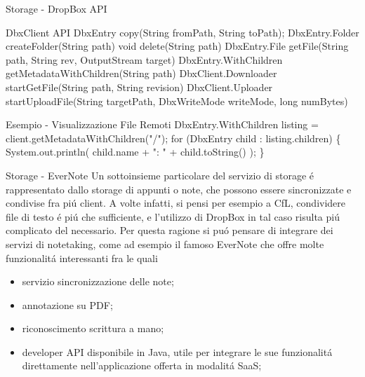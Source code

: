 \documentclass{beamer}
\begin{document}
\begin{frame}{Storage - DropBox API}
\begin{block}{DbxClient API}
{\small
DbxEntry	copy(String fromPath, String toPath);
\newline
DbxEntry.Folder	createFolder(String path)
\newline
void	delete(String path)
\newline
DbxEntry.File	getFile(String path, String rev, OutputStream target)
\newline
DbxEntry.WithChildren	getMetadataWithChildren(String path)
\newline
DbxClient.Downloader	startGetFile(String path, String revision)
\newline
DbxClient.Uploader	startUploadFile(String targetPath, DbxWriteMode writeMode, long numBytes)
}
\end{block}

\begin{exampleblock}{Esempio - Visualizzazione File Remoti}
{\small
DbxEntry.WithChildren listing = client.getMetadataWithChildren("/");
\newline
for (DbxEntry child : listing.children) \{
\newline
\hspace*{5 mm}System.out.println( child.name + ": " + child.toString() );
\newline
\}
}
\end{exampleblock}
\end{frame}



\begin{frame}{Storage - EverNote}
Un sottoinsieme particolare del servizio di storage \'e rappresentato dallo storage di appunti o note, che possono essere
sincronizzate e condivise fra pi\'u client. A volte infatti, si pensi per esempio a CfL, condividere file di testo \'e pi\'u che
sufficiente, e l'utilizzo di DropBox in tal caso risulta pi\'u complicato del necessario. Per questa ragione si pu\'o pensare di integrare dei servizi di
notetaking, come ad esempio il famoso EverNote che offre molte funzionalit\'a interessanti fra le quali
\begin{itemize}
\item servizio sincronizzazione delle note;
\item annotazione su PDF;
\item riconoscimento scrittura a mano;
\item developer API disponibile in Java, utile per integrare le sue funzionalit\'a direttamente nell'applicazione offerta in modalit\'a SaaS;
\end{itemize}
\end{frame}
\end{document}
